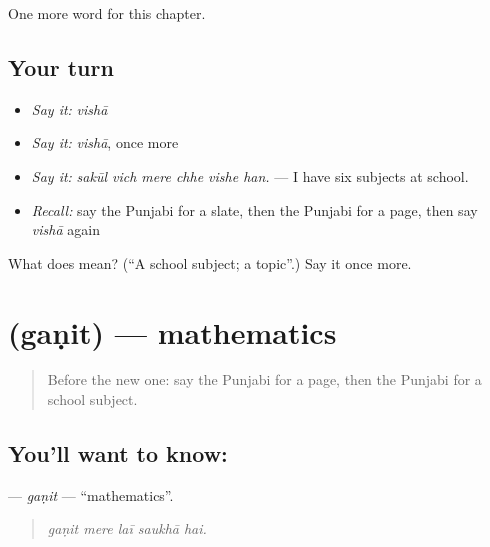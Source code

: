 \begin{grammarlens}[title={What you've built}]
One more word for this chapter.
\end{grammarlens}

\subsection*{Your turn}
\begin{itemize}
\raggedright
  \item \emph{Say it:} \emph{vishā}
  \item \emph{Say it:} \emph{vishā}, once more
  \item \emph{Say it:} \emph{sakūl vich mere chhe vishe han.} — I have six subjects at school.
  \item \emph{Recall:} say the Punjabi for a slate, then the Punjabi for a page, then say \emph{vishā} again
\end{itemize}

\begin{tcolorbox}[breakable,colback=teal!4,colframe=teal!35!black,title={Before you move on}]
What does  mean? (\textquotedblleft{}A school subject; a topic\textquotedblright{}.) Say it once more.
\end{tcolorbox}
\section[\texorpdfstring{\pa{ਗਣਿਤ} (gaṇit)}{ਗਣਿਤ (gaṇit)}]{ (gaṇit) — mathematics}

\label{lesson:PA-C358-ganit}



\begin{quote}
Before the new one: say the Punjabi for a page, then the Punjabi for a school subject.
\end{quote}

\subsection*{You'll want to know: }
\textbf{} — \emph{gaṇit} — \textquotedblleft{}mathematics\textquotedblright{}.

\begin{quote}
    
\end{quote}

\begin{quote}
\emph{gaṇit mere laī saukhā hai.}
\end{quote}

